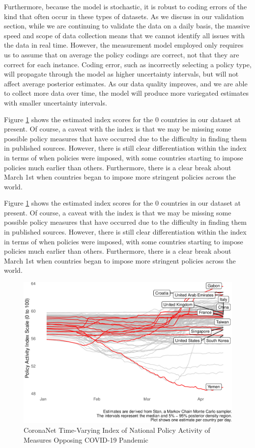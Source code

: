 \documentclass[]{article}
\begin{document}
Furthermore, because the model is stochastic, it is robust to coding errors of the kind that often occur in these types of datasets. As we discuss in our validation section, while we are continuing to validate the data on a daily basis, the massive speed and scope of data collection means that we cannot identify all issues with the data in real time. However, the measurement model employed only requires us to assume that on average the policy codings are correct, not that they are correct for each instance. Coding error, such as incorrectly selecting a policy type, will propagate through the model as higher uncertainty intervals, but will not affect average posterior estimates. As our data quality improves, and we are able to collect more data over time, the model will produce more variegated estimates with smaller uncertainty intervals.

Figure \ref{fig:plotindex} shows the estimated index scores for the 0 countries in our dataset at present. Of course, a caveat with the index is that we may be missing some possible policy measures that have occurred due to the difficulty in finding them in published sources. However, there is still clear differentiation within the index in terms of when policies were imposed, with some countries starting to impose policies much earlier than others. Furthermore, there is a clear break about March 1st when countries began to impose more stringent policies across the world.

Figure \ref{fig:plotindex} shows the estimated index scores for the 0 countries in our dataset at present. Of course, a caveat with the index is that we may be missing some possible policy measures that have occurred due to the difficulty in finding them in published sources. However, there is still clear differentiation within the index in terms of when policies were imposed, with some countries starting to impose policies much earlier than others. Furthermore, there is a clear break about March 1st when countries began to impose more stringent policies across the world.

\begin{figure}
\centering
\includegraphics{corona_wp_files/figure-latex/plotindex-1.pdf}
\caption{\label{fig:plotindex}CoronaNet Time-Varying Index of National Policy Activity of Measures Opposing COVID-19 Pandemic}
\end{figure}
\end{document}
